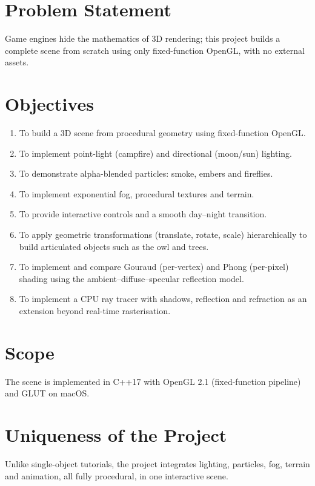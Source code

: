 \documentclass[12pt,a4paper]{report}
\begin{document}
\section{Problem Statement}

Game engines hide the mathematics of 3D rendering; this project builds a complete scene from scratch using only fixed-function OpenGL, with no external assets.

\section{Objectives}

\begin{enumerate}[leftmargin=0.45in]
  \item To build a 3D scene from procedural geometry using fixed-function OpenGL.
  \item To implement point-light (campfire) and directional (moon/sun) lighting.
  \item To demonstrate alpha-blended particles: smoke, embers and fireflies.
  \item To implement exponential fog, procedural textures and terrain.
  \item To provide interactive controls and a smooth day--night transition.
  \item To apply geometric transformations (translate, rotate, scale) hierarchically to build articulated objects such as the owl and trees.
  \item To implement and compare Gouraud (per-vertex) and Phong (per-pixel) shading using the ambient--diffuse--specular reflection model.
  \item To implement a CPU ray tracer with shadows, reflection and refraction as an extension beyond real-time rasterisation.
\end{enumerate}

\section{Scope}

The scene is implemented in C++17 with OpenGL 2.1 (fixed-function pipeline) and GLUT on macOS.

\section{Uniqueness of the Project}

Unlike single-object tutorials, the project integrates lighting, particles, fog, terrain and animation, all fully procedural, in one interactive scene.
\end{document}
